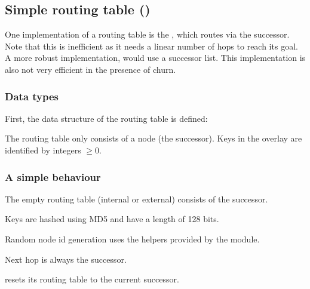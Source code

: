 \subsection{Simple routing table (\texorpdfstring{}{rt\_simple})}

One implementation of a routing table is the , which routes
via the successor. Note that this is inefficient as it needs a linear number
of hops to reach its goal. A more robust implementation, would use a successor
list. This implementation is also not very efficient in the presence of churn.

\subsubsection{Data types}
First, the data structure of the routing table is defined:

The routing table only consists of a node (the successor). Keys in the overlay
are identified by integers $\geq 0$.

\subsubsection{A simple \texorpdfstring{}{rm\_beh} behaviour}

The empty routing table (internal or external)  consists of the successor.

Keys are hashed using MD5 and have a length of 128 bits.

Random node id generation uses the helpers provided by the 
module.

Next hop is always the successor.

 resets its routing table to the current successor.


